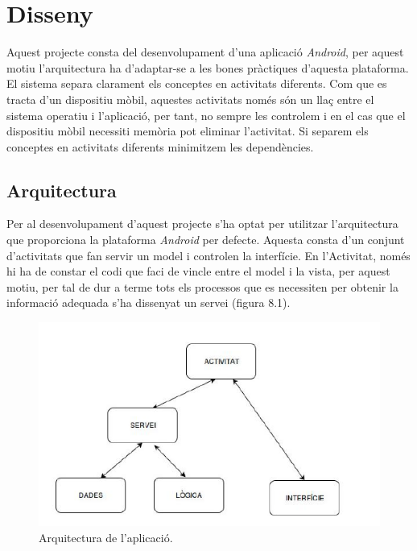 
\chapter{Disseny} %

\label{Disseny} %

Aquest projecte consta del desenvolupament d'una aplicació \textit{Android}, per aquest motiu l'arquitectura ha d'adaptar-se a les bones pràctiques d'aquesta plataforma.\\

El sistema separa clarament els conceptes en activitats diferents. Com que es tracta d'un dispositiu mòbil, aquestes activitats només són un llaç entre el sistema operatiu i l'aplicació, per tant, no sempre les controlem i en el cas que el dispositiu mòbil necessiti memòria pot eliminar l'activitat. Si separem els conceptes en activitats diferents minimitzem les dependències.

\section{Arquitectura}

Per al desenvolupament d'aquest projecte s'ha optat per utilitzar l'arquitectura que proporciona la plataforma \textit{Android} per defecte. Aquesta consta d'un conjunt d'activitats que fan servir un model i controlen la interfície. En l'Activitat, només hi ha de constar el codi que faci de vincle entre el model i la vista, per aquest motiu, per tal de dur a terme tots els processos que es necessiten per obtenir la informació adequada s'ha dissenyat un servei (figura 8.1).

\begin{figure}[!h]
\centering
\includegraphics[scale=0.65]{Figures/ArquitecturaSistema.jpg}
\caption{Arquitectura de l'aplicació.}
\end{figure}

